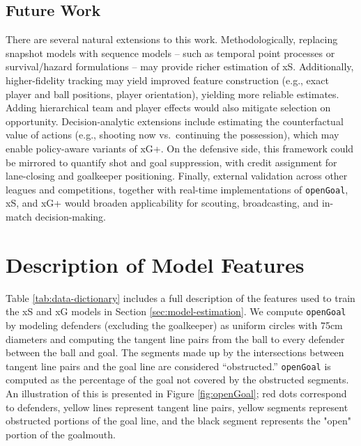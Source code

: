 \documentclass[12pt,letterpaper]{article}
\begin{document}
\subsection{Future Work}

There are several natural extensions to this work. Methodologically, replacing snapshot models with sequence models -- such as temporal point processes or survival/hazard formulations -- may provide richer estimation of xS. Additionally, higher-fidelity tracking may yield improved feature construction (e.g., exact player and ball positions, player orientation), yielding more reliable estimates. Adding hierarchical team and player effects would also mitigate selection on opportunity. Decision-analytic extensions include estimating the counterfactual value of actions (e.g., shooting now vs.\ continuing the possession), which may enable policy-aware variants of xG+. On the defensive side, this framework could be mirrored to quantify shot and goal suppression, with credit assignment for lane-closing and goalkeeper positioning. Finally, external validation across other leagues and competitions, together with real-time implementations of \texttt{openGoal}, xS, and xG+ would broaden applicability for scouting, broadcasting, and in-match decision-making.




\newpage

\appendix

\section{Description of Model Features}\label{app:a}

Table \ref{tab:data-dictionary} includes a full description of the features used to train the xS and xG models in Section \ref{sec:model-estimation}. We compute \texttt{openGoal} by modeling defenders (excluding the goalkeeper) as uniform circles with 75cm diameters and computing the tangent line pairs from the ball to every defender between the ball and goal. The segments made up by the intersections between tangent line pairs and the goal line are considered ``obstructed.'' \texttt{openGoal} is computed as the percentage of the goal not covered by the obstructed segments. An illustration of this is presented in Figure \ref{fig:openGoal}; red dots correspond to defenders, yellow lines represent tangent line pairs, yellow segments represent obstructed portions of the goal line, and the black segment represents the "open" portion of the goalmouth.
\end{document}
